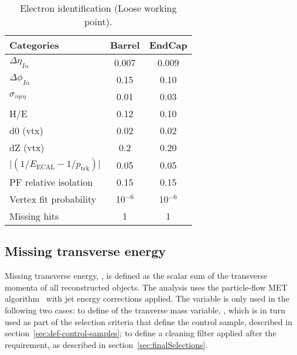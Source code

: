 \begin{table}[h!]
  \caption{Electron identification (Loose working point).\label{tab:ele-id}}
  \centering
  \footnotesize
  \begin{tabular}{ lcc }
    \hline
    \hline
    Categories                                               & Barrel    & EndCap    \\
    \hline
    $\Delta \eta_{In}$                                       & 0.007     & 0.009     \\
    $\Delta \phi_{In}$                                       & 0.15      & 0.10      \\
    $\sigma_{i\eta i\eta}$                                   & 0.01      & 0.03      \\
    H/E                                                      & 0.12      & 0.10      \\
    d0 (vtx)                                                 & 0.02      & 0.02      \\
    dZ (vtx)                                                 & 0.2       & 0.20      \\
    $\lvert(1/E_{\textrm{ECAL}} - 1/p_{\textrm{trk}})\rvert$ & 0.05      & 0.05      \\
    PF relative isolation                                    & 0.15      & 0.15      \\
    Vertex fit probability                                   & 10$^{-6}$ & 10$^{-6}$ \\
    Missing hits                                             & 1         & 1         \\
    \hline
    \hline
  \end{tabular}
\end{table}


\subsection{Missing transverse energy}

Missing transverse energy, \met, is defined as the scalar sum of the transverse momenta 
of all reconstructed objects. The analysis uses the particle-flow MET 
algorithm~\cite{ref:MET-corrections} with jet energy corrections applied. 
The \met variable is only used in the following two cases: to define of the tranverse mass 
variable, \mt, which is in turn used as part of the selection criteria that define the 
\mj control sample, described in section~\ref{sec:def-control-samples}; to define a 
cleaning filter applied after the \alphat requirement, as described in 
section~\ref{sec:finalSelections}.


